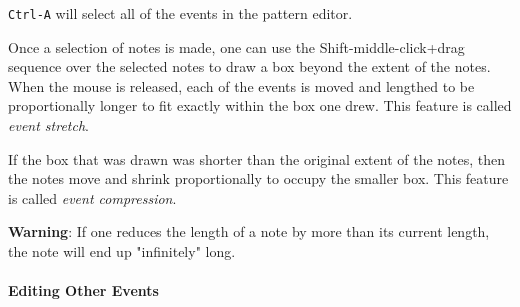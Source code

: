    \texttt{Ctrl-A} will select all of the events in the pattern editor.

%

   Once a selection of notes is made, one can use the
   Shift-middle-click+drag sequence over the selected notes to
   draw a box beyond the extent of the notes.  When the mouse is released,
   each of the events is moved and lengthed to be proportionally longer to
   fit exactly within the box one drew.
   This feature is called \textsl{event stretch}.

   If the box that was drawn was shorter than the original extent of the
   notes, then the notes move and shrink proportionally to occupy the
   smaller box.
   This feature is called \textsl{event compression}.
   
   \textbf{Warning}:  If one reduces the length of a note by more than its
   current length, the note will end up "infinitely" long.

%

\paragraph{Editing Other Events}
\label{paragraph:seq24_pattern_editor_other_events}

